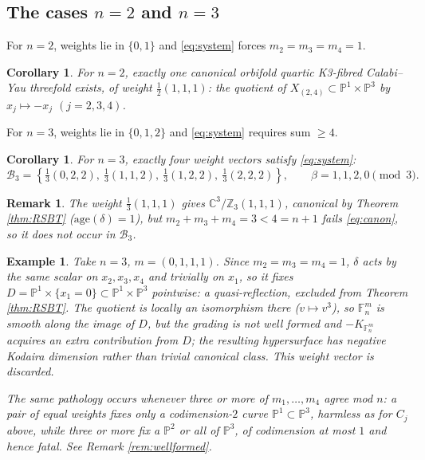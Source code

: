 \documentclass[11pt]{article}
\newtheorem{corollary}[theorem]{Corollary}
\newtheorem{example}[theorem]{Example}
\newtheorem{remark}[theorem]{Remark}
\newcommand{\PP}{\mathbb{P}}
\newcommand{\ZZ}{\mathbb{Z}}
\newcommand{\CC}{\mathbb{C}}
\newcommand{\F}{\mathbb{F}}
\begin{document}
	\subsection{The cases $n=2$ and $n=3$}
	
	For $n=2$, weights lie in $\{0,1\}$ and \eqref{eq:system} forces $m_2=m_3=m_4=1$.
	
	\begin{corollary}\label{cor:n2}
		For $n=2$, exactly one canonical orbifold quartic K3-fibred Calabi--Yau threefold exists, of weight $\frac12(1,1,1)$: the quotient of $X_{(2,4)}\subset\PP^1\times\PP^3$ by $x_j\mapsto-x_j$ $(j=2,3,4)$.
	\end{corollary}
	
	For $n=3$, weights lie in $\{0,1,2\}$ and \eqref{eq:system} requires sum $\ge4$.
	
	\begin{corollary}\label{cor:n3}
		For $n=3$, exactly four weight vectors satisfy \eqref{eq:system}:
		\[
		\mathcal{B}_3=\left\{\tfrac{1}{3}(0,2,2),\ \tfrac{1}{3}(1,1,2),\ \tfrac{1}{3}(1,2,2),\ \tfrac{1}{3}(2,2,2)\right\},\qquad \beta=1,1,2,0\pmod3.
		\]
	\end{corollary}
	
	\begin{remark}
		The weight $\frac13(1,1,1)$ gives $\CC^3/\ZZ_3(1,1,1)$, canonical by Theorem \ref{thm:RSBT} ($\mathrm{age}(\delta)=1$), but $m_2+m_3+m_4=3<4=n+1$ fails \eqref{eq:canon}, so it does not occur in $\mathcal{B}_3$.
	\end{remark}
	
	\begin{example}\label{ex:smooth}
		Take $n=3$, $m=(0,1,1,1)$. Since $m_2=m_3=m_4=1$, $\delta$ acts by the same scalar on $x_2,x_3,x_4$ and trivially on $x_1$, so it fixes $D=\PP^1\times\{x_1=0\}\subset\PP^1\times\PP^3$ pointwise: a quasi-reflection, excluded from Theorem \ref{thm:RSBT}. The quotient is locally an isomorphism there ($v\mapsto v^3$), so $\F^m_n$ is smooth along the image of $D$, but the grading is not well formed and $-K_{\F^m_n}$ acquires an extra contribution from $D$; the resulting hypersurface has negative Kodaira dimension rather than trivial canonical class. This weight vector is discarded.
		
		The same pathology occurs whenever three or more of $m_1,\dots,m_4$ agree mod $n$: a pair of equal weights fixes only a codimension-$2$ curve $\PP^1\subset\PP^3$, harmless as for $C_j$ above, while three or more fix a $\PP^2$ or all of $\PP^3$, of codimension at most $1$ and hence fatal. See Remark \ref{rem:wellformed}.
	\end{example}
	
\end{document}
